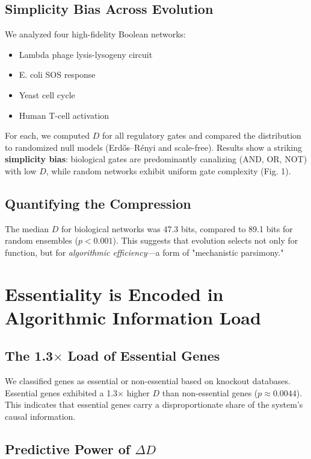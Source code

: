 \documentclass[10pt, twocolumn]{article}
\begin{document}
\subsection{Simplicity Bias Across Evolution}

We analyzed four high-fidelity Boolean networks:
\begin{itemize}
    \item Lambda phage lysis-lysogeny circuit
    \item E. coli SOS response
    \item Yeast cell cycle
    \item Human T-cell activation
\end{itemize}

For each, we computed $D$ for all regulatory gates and compared the distribution to randomized null models (Erdős–Rényi and scale-free). Results show a striking \textbf{simplicity bias}: biological gates are predominantly canalizing (AND, OR, NOT) with low $D$, while random networks exhibit uniform gate complexity (Fig. 1).

\subsection{Quantifying the Compression}

The median $D$ for biological networks was 47.3 bits, compared to 89.1 bits for random ensembles ($p < 0.001$). This suggests that evolution selects not only for function, but for \textit{algorithmic efficiency}—a form of "mechanistic parsimony."

\section{Essentiality is Encoded in Algorithmic Information Load}

\subsection{The 1.3$\times$ Load of Essential Genes}

We classified genes as essential or non-essential based on knockout databases. Essential genes exhibited a 1.3$\times$ higher $D$ than non-essential genes ($p \approx 0.0044$). This indicates that essential genes carry a disproportionate share of the system's causal information.

\subsection{Predictive Power of $\Delta D$}
\end{document}

